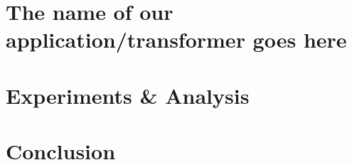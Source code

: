\section{The name of our application/transformer goes here} %



\section{Experiments \& Analysis}\label{sec:ExpRes}


\section{Conclusion}





\appendix
%

